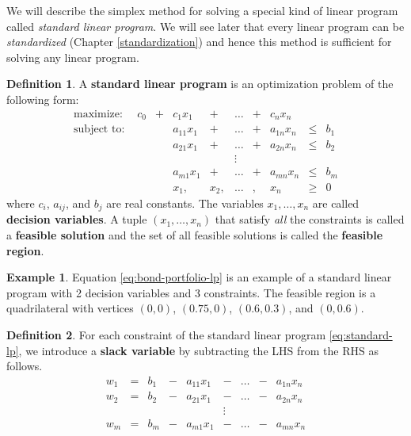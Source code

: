 \documentclass[
]{book}
\theoremstyle{definition}
\newtheorem{definition}{Definition}[chapter]
\theoremstyle{definition}
\newtheorem{example}{Example}[chapter]
\theoremstyle{definition}
\theoremstyle{definition}
\theoremstyle{remark}
\begin{document}
We will describe the simplex method for solving a special kind of linear program called \emph{standard linear program}.
We will see later that every linear program can be \emph{standardized} (Chapter \ref{standardization}) and hence this method is sufficient for solving any linear program.

\begin{definition}
A \textbf{standard linear program} is an optimization problem of the following form:
\begin{equation}
  \begin{array}{lrrrrrrrrr}
    \mbox{maximize: } & c_0 & + & c_1 x_1 & + & \dots & + & c_n x_n & \\
    \mbox{subject to: } 
      & & & a_{11} x_1 & + & \dots & + & a_{1n} x_n & \leq & b_1 \\
      & & & a_{21} x_1 & + & \dots & + & a_{2n} x_n & \leq & b_2 \\
      & & & & & \vdots &  \\
      & & & a_{m1} x_1 & + & \dots & + & a_{mn} x_n & \leq & b_m \\
      & & & x_1, & x_2, & \dots &, & x_n & \geq & 0
  \end{array} 
  \label{eq:standard-lp}
\end{equation}
where \(c_i\), \(a_{ij}\), and \(b_j\) are real constants. The variables \(x_1, \dots, x_n\) are called \textbf{decision variables}. A tuple \((x_1, \dots, x_n)\) that satisfy \emph{all} the constraints is called a \textbf{feasible solution} and the set of all feasible solutions is called the \textbf{feasible region}.
\end{definition}

\begin{example}
Equation \eqref{eq:bond-portfolio-lp} is an example of a standard linear program with 2 decision variables and 3 constraints. The feasible region is a quadrilateral with vertices \((0,0)\), \((0.75, 0)\), \((0.6, 0.3)\), and \((0, 0.6)\).
\end{example}

\begin{definition}
For each constraint of the standard linear program \eqref{eq:standard-lp}, we introduce a \textbf{slack variable} by subtracting the LHS from the RHS as follows.
\begin{equation}
  \begin{array}{lrrrrrrrrr}
      w_1 & = & b_1 & - & a_{11} x_1 & - & \dots & - & a_{1n} x_n \\
      w_2 & = & b_2 & - & a_{21} x_1 & - & \dots & - & a_{2n} x_n \\
      & & & & & \vdots &  \\
      w_m & = & b_m & - & a_{m1} x_1 & - & \dots & - & a_{mn} x_n 
  \end{array} 
  \label{eq:slack-variables-def}
\end{equation}
\end{definition}
\end{document}
